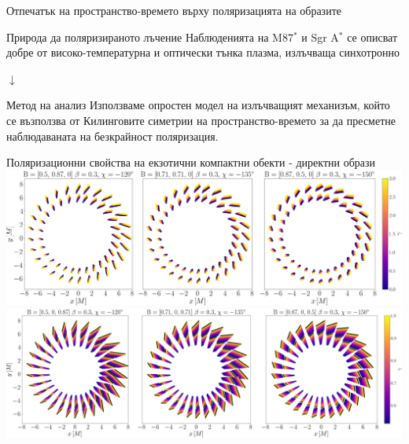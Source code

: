 \documentclass[hyperref={colorlinks,citecolor=blue,linkcolor=blue,urlcolor=blue}]{beamer}
\begin{document}
	\begin{frame}{Отпечатък на пространство-времето върху поляризацията на образите}
		\begin{block}{Природа да поляризираното лъчение}
			Наблюденията на M87$^*$ и Sgr A$^*$ се описват добре от високо-температурна и оптически тънка плазма, излъчваща синхотронно
		\end{block}
		
		\begin{center}
			$\downarrow$
		\end{center}
		
		\begin{block}{Метод на анализ}
			Използваме опростен модел на излъчващият механизъм, който се възползва от Килинговите симетрии на пространство-времето за да пресметне наблюдаваната на безкрайност поляризация.
		\end{block}
	\end{frame}
	
	\begin{frame}{Поляризационни свойства на екзотични компактни обекти - директни образи}
		\centering
		\includegraphics[scale = 0.14]{Section_7_Polarized_Emission/WH_alpha_Eq_Field.png}\\
		\includegraphics[scale = 0.12]{Section_7_Polarized_Emission/JNW_alpha_Eq_Field.png}
	\end{frame}
	
\end{document}
